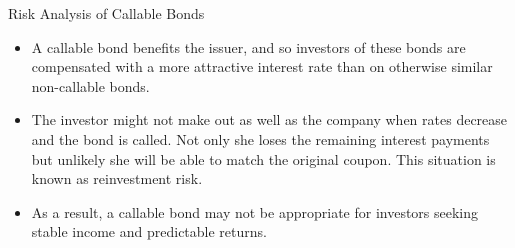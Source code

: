 \documentclass{beamer}
\begin{document}

	\begin{frame}{Risk Analysis of Callable Bonds}
		\begin{itemize}
			\item A callable bond benefits the issuer, and so investors of these bonds are compensated with a more attractive interest rate than on otherwise similar non-callable bonds.
			\item<1-> The investor might not make out as well as the company when rates decrease and the bond is called. Not only she loses the remaining interest payments but unlikely she will be able to match the original coupon.
			\textcolor{maincolor}{This situation is known as reinvestment risk}.

			\item<2-> As a result, a callable bond may not be appropriate for investors seeking stable income and predictable returns.
		\end{itemize}
	\end{frame}
\end{document}
